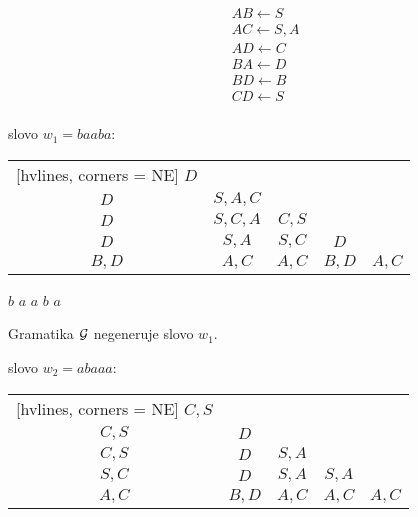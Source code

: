 \begin{multicols}{2}
    \begin{align*}
        & AB \leftarrow S \\
        & AC \leftarrow S, A \\
        & AD \leftarrow C \\
        & BA \leftarrow D \\
        & BD \leftarrow B \\
        & CD \leftarrow S \\
    \end{align*}

    slovo $w_1 = baaba$:

    \vspace*{2mm}

    \begin{NiceTabular}{ccccc}[hvlines, corners = NE] %
        $D$ &  &   &   &   \\
        $D$ & $S, A, C$ &  &   &   \\
        $D$ & $S, C, A$ & $C, S$ &  &  \\
        $D$ & $S, A$ & $S, C$ & $D$ &  \\
        $B, D$ & $A,C$ & $A,C$ & $B, D$ & $A, C$ \\
    \end{NiceTabular}

    \vspace*{-2mm}

    \hspace*{5mm}$b$ \hspace*{10mm} $a$ \hspace*{10mm} $a$ \hspace*{9mm} $b$ \hspace*{8mm} $a$

    \vspace*{2mm}
    Gramatika $\mathcal{G}$ negeneruje slovo $w_1$.

    slovo $w_2 = abaaa$:

    \begin{NiceTabular}{ccccc}[hvlines, corners = NE] %
        $C,S$ &   &   &   &   \\
        $C, S$ & $D$ &   &   &   \\
        $C,S$ & $D$ & $S,A$ &   &   \\
        $S,C$ & $D$ & $S,A$ & $S,A$ &   \\
        $A,C$ & $B, D$ & $A,C$ & $A,C$ & $A,C$ \\
    \end{NiceTabular}


\end{multicols}
